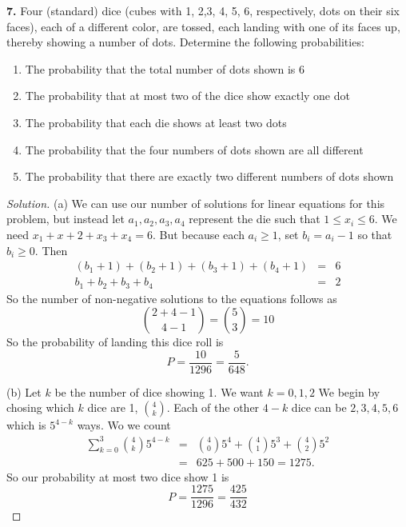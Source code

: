 \documentclass[12pt]{amsart}
\newenvironment{solution}
{\begin{proof}[Solution]}
{\end{proof}}
\begin{document}
\begin{onehalfspace}
        \textbf{7.} Four (standard) dice (cubes with 1, 2,3, 4, 5, 6, respectively, dots
        on their six faces), each of a different color, are tossed, each landing with one
        of its faces up, thereby showing a number of dots. Determine the following probabilities:
        \begin{enumerate}[label=(\alph*)]
            \item The probability that the total number of dots shown is 6
            \item The probability that at most two of the dice show exactly one dot
            \item The probability that each die shows at least two dots
            \item The probability that the four numbers of dots shown are all different
            \item The probability that there are exactly two different numbers of dots shown
        \end{enumerate}
        \begin{solution}
            (a) We can use our number of solutions for linear equations for this problem, but instead
            let $a_1, a_2, a_3, a_4$ represent the die such that $1 \le x_i \le 6$. We need $x_1 + x+2 + x_3 + x_4 = 6$.
            But because each $a_i \ge 1$, set $b_i = a_i - 1$ so that $b_i \ge 0$. Then
            \begin{eqnarray*}
                (b_1 + 1) + (b_2 + 1) + (b_3 + 1) + (b_4 + 1) & = & 6 \\
                b_1 + b_2 + b_3 + b_4 & = & 2
            \end{eqnarray*}
            So the number of non-negative solutions to the equations follows as
            \begin{displaymath}
                \binom{2 + 4 - 1}{4 - 1} = \binom{5}{3} = 10
            \end{displaymath}
            So the probability of landing this dice roll is
            \begin{displaymath}
                P = \frac{10}{1296} = \frac{5}{648}.
            \end{displaymath}

            (b) Let $k$ be the number of dice showing 1. We want $k = 0, 1, 2$
            We begin by chosing which $k$ dice are 1, $\binom{4}{k}$. Each of the other
            $4 - k$ dice can be $2, 3, 4, 5, 6$ which is $5^{4-k}$ ways. Wo we count
            \begin{eqnarray*}
                \sum_{k=0}^3 \binom{4}{k}5^{4-k} & = & \binom{4}{0}5^4 + \binom{4}{1}{5^3} + \binom{4}{2}5^2 \\
                             & = & 625 + 500 + 150 = 1275.
            \end{eqnarray*}
            So our probability at most two dice show 1 is
            \begin{displaymath}
                P = \frac{1275}{1296} = \frac{425}{432}
            \end{displaymath}


\end{solution}
\end{onehalfspace}
\end{document}
